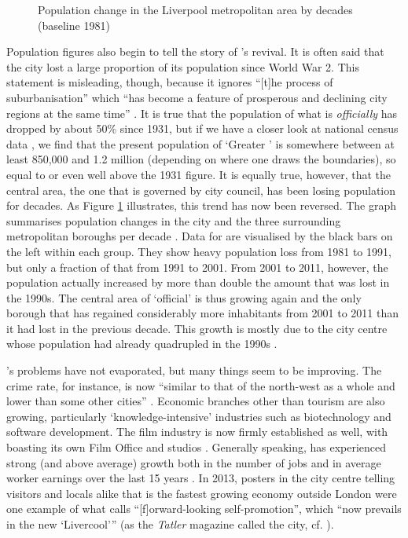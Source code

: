 	\begin{figure}[h]
		\centering
		
		\caption[Population change in the {Liverpool} area]{Population change in the {Liverpool} metropolitan area by decades (baseline 1981)}
		\label{fig.population}
	\end{figure}

Population figures also begin to tell the story of 's revival.
It is often said that the city lost a large proportion of its population since World War 2.
This statement is misleading, though, because it ignores ``[t]he process of suburbanisation'' which ``has become a feature of prosperous and declining city regions at the same time'' \citep[21]{fraser2003}.
It is true that the population of what is \emph{officially}  has dropped by about 50\% since 1931, but if we have a closer look at national census data \parencite{nomis}, we find that the present population of `Greater ' is somewhere between at least 850,000 and 1.2 million (depending on where one draws the boundaries), so equal to or even well above the 1931 figure.
It is equally true, however, that the central area, the one that is governed by  city council, has been losing population for decades.
As Figure \ref{fig.population} illustrates, this trend has now been reversed.
The graph summarises population changes in the city and the three surrounding metropolitan boroughs per decade \parencite{nomis}.
Data for  are visualised by the black bars on the left within each group.
They show heavy population loss from 1981 to 1991, but only a fraction of that from 1991 to 2001.
From 2001 to 2011, however, the population actually increased by more than double the amount that was lost in the 1990s.
The central area of `official'  is thus growing again and the only borough that has regained considerably more inhabitants from 2001 to 2011 than it had lost in the previous decade.
This growth is mostly due to the city centre whose population had already quadrupled in the 1990s \citep[cf.][xix]{belchem2006c}.

's problems have not evaporated, but many things seem to be improving.
The crime rate, for instance, is now ``similar to that of the north-west as a whole and lower than some other cities''  \citep[235]{pooley2006}.
Economic branches other than tourism are also growing, particularly `knowledge-intensive' industries such as biotechnology \citep[cf.][204]{percy2003} and software development.
The film industry is now firmly established as well, with  boasting its own Film Office and studios \parencite[cf.][478--480]{murden2006}.
Generally speaking,  has experienced strong (and above average) growth both in the number of jobs and in average worker earnings over the last 15 years \parencite[cf.][4]{lcc2016}.
In 2013, posters in the city centre telling visitors and locals alike that  is the fastest growing economy outside London were one example of what \citet[54]{belchem2006a} calls ``[f]orward-looking self-promotion'', which ``now prevails in the new `Livercool'{}'' (as the \emph{Tatler} magazine called the city, cf. \citealt[484]{murden2006}).

